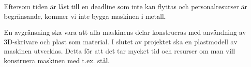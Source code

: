 Eftersom tiden är låst till en deadline som inte kan flyttas och personalresurser är begränsande, kommer vi inte bygga maskinen i metall.

En avgränsning ska vara att alla maskinens delar konstrueras med användning av 3D-skrivare och plast som material. I slutet av projektet ska en plastmodell av maskinen utvecklas. Detta för att det tar mycket tid och resurser om man vill konstruera maskinen med t.ex. stål.
